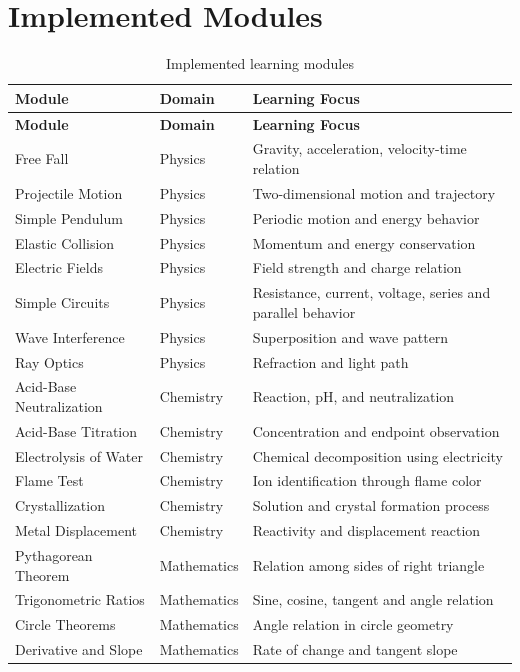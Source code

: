 \documentclass[12pt,a4paper]{report}
\begin{document}
\section{Implemented Modules}
\begin{longtable}{p{} p{} p{}}
\caption{Implemented learning modules}\\
\toprule
\textbf{Module} & \textbf{Domain} & \textbf{Learning Focus} \\
\midrule
\endfirsthead
\toprule
\textbf{Module} & \textbf{Domain} & \textbf{Learning Focus} \\
\midrule
\endhead
Free Fall & Physics & Gravity, acceleration, velocity-time relation \\
Projectile Motion & Physics & Two-dimensional motion and trajectory \\
Simple Pendulum & Physics & Periodic motion and energy behavior \\
Elastic Collision & Physics & Momentum and energy conservation \\
Electric Fields & Physics & Field strength and charge relation \\
Simple Circuits & Physics & Resistance, current, voltage, series and parallel behavior \\
Wave Interference & Physics & Superposition and wave pattern \\
Ray Optics & Physics & Refraction and light path \\
Acid-Base Neutralization & Chemistry & Reaction, pH, and neutralization \\
Acid-Base Titration & Chemistry & Concentration and endpoint observation \\
Electrolysis of Water & Chemistry & Chemical decomposition using electricity \\
Flame Test & Chemistry & Ion identification through flame color \\
Crystallization & Chemistry & Solution and crystal formation process \\
Metal Displacement & Chemistry & Reactivity and displacement reaction \\
Pythagorean Theorem & Mathematics & Relation among sides of right triangle \\
Trigonometric Ratios & Mathematics & Sine, cosine, tangent and angle relation \\
Circle Theorems & Mathematics & Angle relation in circle geometry \\
Derivative and Slope & Mathematics & Rate of change and tangent slope \\
\bottomrule
\end{longtable}
\end{document}
